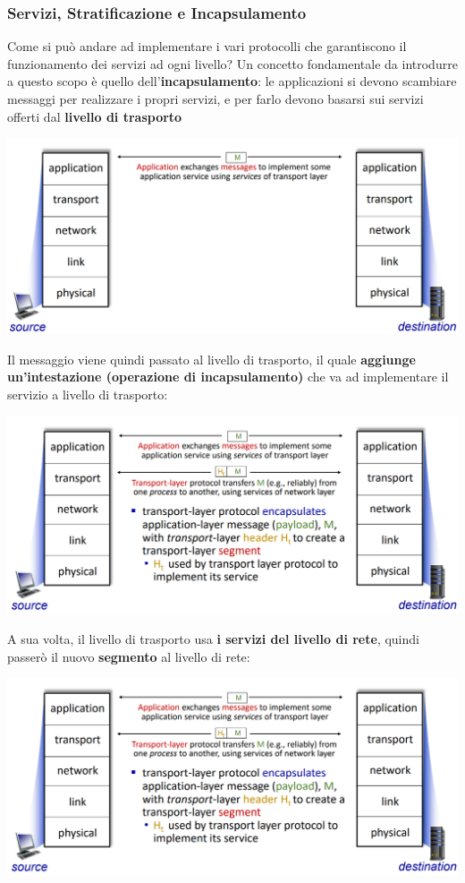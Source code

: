 \documentclass[12pt]{article}
\begin{document}
\subsubsection{Servizi, Stratificazione e Incapsulamento}
Come si può andare ad implementare i vari protocolli che garantiscono il funzionamento dei servizi ad ogni livello?
Un concetto fondamentale da introdurre a questo scopo è quello dell'\textbf{incapsulamento}: le applicazioni si devono
scambiare messaggi per realizzare i propri servizi, e per farlo devono basarsi sui servizi offerti dal \textbf{livello di trasporto}
\begin{center}
    \includegraphics[width =1\linewidth]{Images/25.PNG}
\end{center}
Il messaggio viene quindi passato al livello di trasporto, il quale \textbf{aggiunge un'intestazione (operazione di incapsulamento)} che va ad implementare il servizio a livello di trasporto:
\begin{center}
    \includegraphics[width =1\linewidth]{Images/26.PNG}
\end{center}
A sua volta, il livello di trasporto usa \textbf{i servizi del livello di rete}, quindi passerò il nuovo \textbf{segmento} al livello di rete:
\begin{center}
    \includegraphics[width =1\linewidth]{Images/26.PNG}
\end{center}
\end{document}
